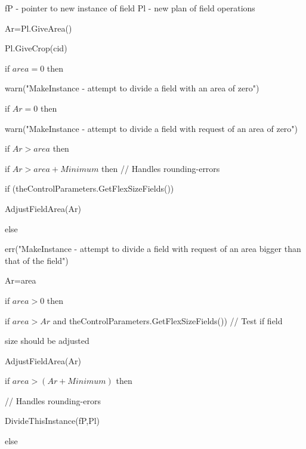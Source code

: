 \documentclass[%
]{scrartcl}
\begin{document}
   fP -  pointer to new instance of field
   Pl -  new plan of field operations

	
	Ar=Pl.GiveArea()
	
	Pl.GiveCrop(cid)

   if $area=0$ then
	
		 \quad warn("MakeInstance - attempt to divide a field with an area of zero")

	if $Ar=0$ then
	
		\quad  warn("MakeInstance - attempt to divide a field with request of an area of zero")

	if $Ar>area$ then
  
\quad 	if $Ar>area+Minimum$ then // Handles rounding-errors
		
    \quad \quad      if (theControlParameters.GetFlexSizeFields())
    
    \quad \quad \quad         AdjustFieldArea(Ar)
    
     \quad \quad     else
     
   	\quad \quad \quad 		err("MakeInstance - attempt to divide a field with request of an area bigger than that of the field")
		
	\quad \quad 	Ar=area
	
	
	
	
	if $area>0$ then
   
		if $area > Ar$  and  theControlParameters.GetFlexSizeFields()) // Test if field 
		
	 \quad		size should be adjusted
		
      \quad	    AdjustFieldArea(Ar)
		
		if $area > (Ar+Minimum)$ then
		
	 \quad		 // Handles rounding-erors
       
      \quad	  	DivideThisInstance(fP,Pl)
		
		else
		
\end{document}
